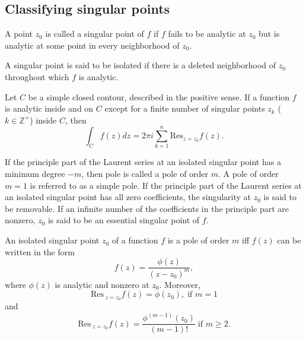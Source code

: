 \documentclass{article}
\begin{document}
\subsection{Classifying singular points}
\begin{definition}
	A point \(z_0\) is called a singular point of \(f\) if \(f\) fails to be analytic at \(z_0\) but is analytic at some point in every neighborhood of \(z_0\).
\end{definition}
\begin{definition}
	A singular point is said to be isolated if there is a deleted neighborhood of \(z_0\) throughout which \(f\) is analytic.
\end{definition}
\begin{theorem}
	Let \(C\) be a simple closed contour, described in the positive sense. If a function \(f\) is analytic inside and on \(C\) except for a finite number of singular points \(z_k\) (\(k\in\mathbb{Z}^+\)) inside \(C\), then
	\begin{equation*}
		\int_C f(z)dz=2\pi i\sum_{k=1}^{n}\text{Res}_{z=z_k}f(z).
	\end{equation*}
\end{theorem}
\begin{definition}
	If the principle part of the Laurent series at an isolated singular point has a minimum degree \(-m\), then pole is called a pole of order \(m\). A pole of order \(m=1\) is referred to as a simple pole.\medbreak
	If the principle part of the Laurent series at an isolated singular point has all zero coefficients, the singularity at \(z_0\) is said to be removable.\medbreak
	If an infinite number of the coefficients in the principle part are nonzero, \(z_0\) is said to be an essential singular point of \(f\).
\end{definition}
\begin{theorem}
	An isolated singular point \(z_0\) of a function \(f\) is a pole of order \(m\) iff \(f(z)\) can be written in the form
	\begin{equation*}
		f(z)=\frac{\phi(z)}{(z-z_0)^m},
	\end{equation*}
	where \(\phi(z)\) is analytic and nonzero at \(z_0\). Moreover,
	\begin{equation*}
		\text{Res}\,_{z=z_0}f(z)=\phi(z_0),\;\text{if }m=1
	\end{equation*}
	and
	\begin{equation*}
		\text{Res}\,_{z=z_0}f(z)=\frac{\phi^{(m-1)}(z_0)}{(m-1)!}\;\text{if }m\geq 2.
	\end{equation*}
\end{theorem}
\end{document}
